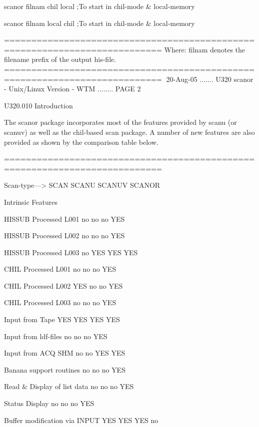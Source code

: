    scanor filnam chil local  ;To start in chil-mode &  local-memory
 
   scanor filnam local chil  ;To start in chil-mode &  local-memory
 
   ===========================================================================
   Where: filnam denotes the filename prefix of the output his-file.
   ===========================================================================
    
   20-Aug-05 ....... U320  scanor - Unix/Linux Version - WTM ........ PAGE   2
 
 
   U320.010  Introduction
 
   The  scanor package incorporates most of the features provided by scanu (or
   scanuv) as well as the chil-based scan package. A number  of  new  features
   are also provided as shown by the comparison table below.
 
   ===========================================================================
 
   Scan-type--->                  SCAN     SCANU    SCANUV    SCANOR
 
   Intrinsic Features
 
   HISSUB Processed L001            no        no        no       YES
 
   HISSUB Processed L002            no        no        no       YES
 
   HISSUB Processed L003            no       YES       YES       YES
 
   CHIL   Processed L001            no        no        no       YES
 
   CHIL   Processed L002           YES        no        no       YES
 
   CHIL   Processed L003            no        no        no       YES
 
   Input from Tape                 YES       YES       YES       YES
 
   Input from ldf-files             no        no        no       YES
 
   Input from ACQ SHM               no        no       YES       YES
 
   Banana support routines          no        no        no       YES
 
   Read & Display of list data      no        no        no       YES
 
   Status Display                   no        no        no       YES
 
   Buffer modification via INPUT   YES       YES       YES        no
 
